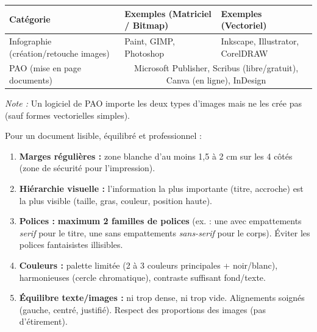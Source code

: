 \documentclass[11pt]{article}
\begin{document}
\begin{propriete}
\begin{center}
\begin{tabularx}{\linewidth}{|l|X|X|}
\hline
\rowcolor{popblueL} \textbf{Catégorie} & \textbf{Exemples (Matriciel / Bitmap)} & \textbf{Exemples (Vectoriel)} \\
\hline
Infographie (création/retouche images) & Paint, GIMP, Photoshop & Inkscape, Illustrator, CorelDRAW \\
\hline
PAO (mise en page documents) & \multicolumn{2}{c|}{Microsoft Publisher, Scribus (libre/gratuit), Canva (en ligne), InDesign} \\
\hline
\end{tabularx}
\end{center}
\emph{Note :} Un logiciel de PAO importe les deux types d'images mais ne les crée pas (sauf formes vectorielles simples).
\end{propriete}

\begin{propriete}
Pour un document lisible, équilibré et professionnel :
\begin{enumerate}
\item \textbf{Marges régulières :} zone blanche d'au moins 1,5 à 2 cm sur les 4 côtés (zone de sécurité pour l'impression).
\item \textbf{Hiérarchie visuelle :} l'information la plus importante (titre, accroche) est la plus visible (taille, gras, couleur, position haute).
\item \textbf{Polices :} \textbf{maximum 2 familles de polices} (ex. : une avec empattements \emph{serif} pour le titre, une sans empattements \emph{sans-serif} pour le corps). Éviter les polices fantaisistes illisibles.
\item \textbf{Couleurs :} palette limitée (2 à 3 couleurs principales + noir/blanc), harmonieuses (cercle chromatique), contraste suffisant fond/texte.
\item \textbf{Équilibre texte/images :} ni trop dense, ni trop vide. Alignements soignés (gauche, centré, justifié). Respect des proportions des images (pas d'étirement).
\end{enumerate}
\end{propriete}
\end{document}
